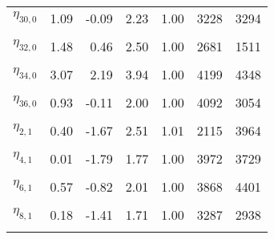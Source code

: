 \begin{table}
\begin{tabular}[t]{lrrrrrr}
$\eta_{30, 0}$ & 1.09 & -0.09 & 2.23 & 1.00 & 3228 & 3294\\
\cellcolor{gray!6}{$\eta_{31, 0}$} & \cellcolor{gray!6}{2.32} & \cellcolor{gray!6}{1.17} & \cellcolor{gray!6}{3.45} & \cellcolor{gray!6}{1.00} & \cellcolor{gray!6}{3988} & \cellcolor{gray!6}{4698}\\
$\eta_{32, 0}$ & 1.48 & 0.46 & 2.50 & 1.00 & 2681 & 1511\\
\cellcolor{gray!6}{$\eta_{33, 0}$} & \cellcolor{gray!6}{3.83} & \cellcolor{gray!6}{2.56} & \cellcolor{gray!6}{5.12} & \cellcolor{gray!6}{1.00} & \cellcolor{gray!6}{2970} & \cellcolor{gray!6}{3179}\\
$\eta_{34, 0}$ & 3.07 & 2.19 & 3.94 & 1.00 & 4199 & 4348\\
\cellcolor{gray!6}{$\eta_{35, 0}$} & \cellcolor{gray!6}{1.52} & \cellcolor{gray!6}{0.43} & \cellcolor{gray!6}{2.58} & \cellcolor{gray!6}{1.00} & \cellcolor{gray!6}{3964} & \cellcolor{gray!6}{4482}\\
$\eta_{36, 0}$ & 0.93 & -0.11 & 2.00 & 1.00 & 4092 & 3054\\
\cellcolor{gray!6}{$\eta_{1, 1}$} & \cellcolor{gray!6}{0.41} & \cellcolor{gray!6}{-1.21} & \cellcolor{gray!6}{2.00} & \cellcolor{gray!6}{1.00} & \cellcolor{gray!6}{2044} & \cellcolor{gray!6}{1567}\\
$\eta_{2, 1}$ & 0.40 & -1.67 & 2.51 & 1.01 & 2115 & 3964\\
\cellcolor{gray!6}{$\eta_{3, 1}$} & \cellcolor{gray!6}{2.12} & \cellcolor{gray!6}{0.41} & \cellcolor{gray!6}{3.91} & \cellcolor{gray!6}{1.00} & \cellcolor{gray!6}{2953} & \cellcolor{gray!6}{1352}\\
$\eta_{4, 1}$ & 0.01 & -1.79 & 1.77 & 1.00 & 3972 & 3729\\
\cellcolor{gray!6}{$\eta_{5, 1}$} & \cellcolor{gray!6}{-0.72} & \cellcolor{gray!6}{-2.70} & \cellcolor{gray!6}{1.11} & \cellcolor{gray!6}{1.00} & \cellcolor{gray!6}{3787} & \cellcolor{gray!6}{1813}\\
$\eta_{6, 1}$ & 0.57 & -0.82 & 2.01 & 1.00 & 3868 & 4401\\
\cellcolor{gray!6}{$\eta_{7, 1}$} & \cellcolor{gray!6}{2.51} & \cellcolor{gray!6}{0.05} & \cellcolor{gray!6}{5.21} & \cellcolor{gray!6}{1.01} & \cellcolor{gray!6}{2828} & \cellcolor{gray!6}{3802}\\
$\eta_{8, 1}$ & 0.18 & -1.41 & 1.71 & 1.00 & 3287 & 2938\\
\cellcolor{gray!6}{$\eta_{9, 1}$} & \cellcolor{gray!6}{-0.39} & \cellcolor{gray!6}{-3.11} & \cellcolor{gray!6}{2.09} & \cellcolor{gray!6}{1.00} & \cellcolor{gray!6}{2763} & \cellcolor{gray!6}{1644}\\

\end{tabular}
\end{table}
